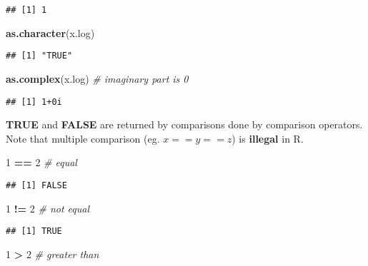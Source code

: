 \documentclass[
  12pt,
]{article}
\newenvironment{Shaded}{\begin{snugshade}}{\end{snugshade}}
\newcommand{\CommentTok}[1]{\textcolor[rgb]{0.56,0.35,0.01}{\textit{#1}}}
\newcommand{\DecValTok}[1]{\textcolor[rgb]{0.00,0.00,0.81}{#1}}
\newcommand{\FunctionTok}[1]{\textcolor[rgb]{0.13,0.29,0.53}{\textbf{#1}}}
\newcommand{\NormalTok}[1]{#1}
\newcommand{\SpecialCharTok}[1]{\textcolor[rgb]{0.81,0.36,0.00}{\textbf{#1}}}
\begin{document}
\begin{verbatim}
## [1] 1
\end{verbatim}

\begin{Shaded}
\begin{Highlighting}[]
\FunctionTok{as.character}\NormalTok{(x.log)}
\end{Highlighting}
\end{Shaded}

\begin{verbatim}
## [1] "TRUE"
\end{verbatim}

\begin{Shaded}
\begin{Highlighting}[]
\FunctionTok{as.complex}\NormalTok{(x.log)  }\CommentTok{\# imaginary part is 0}
\end{Highlighting}
\end{Shaded}

\begin{verbatim}
## [1] 1+0i
\end{verbatim}

\textbf{TRUE} and \textbf{FALSE} are returned by comparisons done by
comparison operators. Note that multiple comparison (eg.
\(x == y == z\)) is \textbf{illegal} in R.

\begin{Shaded}
\begin{Highlighting}[]
\DecValTok{1} \SpecialCharTok{==} \DecValTok{2}   \CommentTok{\# equal}
\end{Highlighting}
\end{Shaded}

\begin{verbatim}
## [1] FALSE
\end{verbatim}

\begin{Shaded}
\begin{Highlighting}[]
\DecValTok{1} \SpecialCharTok{!=} \DecValTok{2}   \CommentTok{\# not equal}
\end{Highlighting}
\end{Shaded}

\begin{verbatim}
## [1] TRUE
\end{verbatim}

\begin{Shaded}
\begin{Highlighting}[]
\DecValTok{1} \SpecialCharTok{\textgreater{}}  \DecValTok{2}   \CommentTok{\# greater than}
\end{Highlighting}
\end{Shaded}
\end{document}
